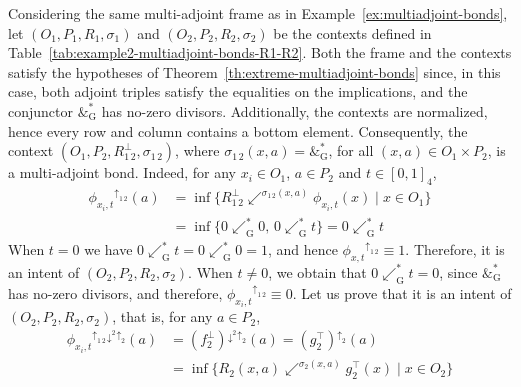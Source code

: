 \documentclass[runningheads,a4paper]{llncs}
\newcommand{\up}[1][]{{^{\uparrow_{#1}}}}
\newcommand{\down}[1][]{{^{\downarrow^{#1}}}}
\newcommand{\adjoint}{\mathop{\&}\nolimits}
\newcommand{\G}{\text{G}}
\begin{document}
\begin{example}
Considering the same multi-adjoint frame as in Example~\ref{ex:multiadjoint-bonds}, let $(O_1, P_1, R_1, \sigma_1)$ and $(O_2, P_2, R_2, \sigma_2)$ be the contexts defined in Table~\ref{tab:example2-multiadjoint-bonds-R1-R2}. Both the frame and the contexts satisfy the hypotheses of Theorem~\ref{th:extreme-multiadjoint-bonds} since, in this case, both adjoint triples satisfy the equalities on the implications, and the conjunctor $\adjoint^*_\G$ has no-zero divisors. Additionally, the contexts are normalized, hence every row and column contains a bottom element.
Consequently, the context $(O_1, P_2, R_{1\,2}^\bot, \sigma_{1\,2})$, where $\sigma_{1\,2}(x, a) = \adjoint^*_\G$, for all $(x, a) \in O_1 \times P_2$, is a multi-adjoint bond. Indeed, for any $x_i \in O_1$, $a \in P_2$ and $t \in [0, 1]_4$,
\begin{align*}
    \phi_{x_i, t}\up[1\,2](a) &= \inf \{R_{1\,2}^\bot \swarrow^{\sigma_{1\,2}(x, a)} \phi_{x_i, t}(x) \mid x \in O_1\} \\
    &= \inf \{0 \swarrow^*_\G 0, \, 0 \swarrow^*_\G t\} = 0 \swarrow^*_\G t
\end{align*}
When $t = 0$ we have $0 \swarrow^*_\G t = 0 \swarrow^*_\G 0 = 1$, and hence $\phi_{x, t}\up[1\,2] \equiv 1$. Therefore, it is an intent of $(O_2, P_2, R_2, \sigma_2)$. When $t \neq 0$, we obtain that $0 \swarrow^*_\G t = 0$, since $\adjoint^*_\G$ has no-zero divisors, and therefore, $\phi_{x_i, t}\up[1\,2] \equiv 0$. Let us prove that it is an intent of $(O_2, P_2, R_2, \sigma_2)$, that is, for any $a \in P_2$,
\begin{align*}
    \phi_{x_i, t}\up[1\,2]\down[2]\up[2](a) &= (f_2^\bot)\down[2]\up[2](a) = (g_2^\top)\up[2](a) \\
    &= \inf \{R_2(x, a) \swarrow^{\sigma_2(x, a)} g_2^\top(x) \mid x \in O_2\} \\

\end{align*}
\end{example}
\end{document}
